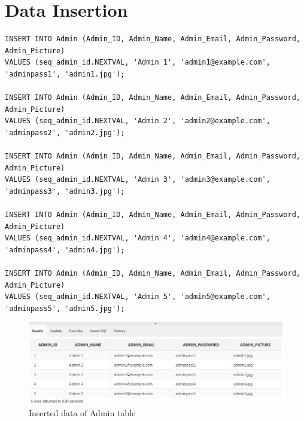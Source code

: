 \section{Data Insertion}
\hrulefill
\begin{lstlisting}[caption={Inserting data into Admin table},label={lst:insert_admin}]
INSERT INTO Admin (Admin_ID, Admin_Name, Admin_Email, Admin_Password, Admin_Picture)
VALUES (seq_admin_id.NEXTVAL, 'Admin 1', 'admin1@example.com', 'adminpass1', 'admin1.jpg');

INSERT INTO Admin (Admin_ID, Admin_Name, Admin_Email, Admin_Password, Admin_Picture)
VALUES (seq_admin_id.NEXTVAL, 'Admin 2', 'admin2@example.com', 'adminpass2', 'admin2.jpg');

INSERT INTO Admin (Admin_ID, Admin_Name, Admin_Email, Admin_Password, Admin_Picture)
VALUES (seq_admin_id.NEXTVAL, 'Admin 3', 'admin3@example.com', 'adminpass3', 'admin3.jpg');

INSERT INTO Admin (Admin_ID, Admin_Name, Admin_Email, Admin_Password, Admin_Picture)
VALUES (seq_admin_id.NEXTVAL, 'Admin 4', 'admin4@example.com', 'adminpass4', 'admin4.jpg');

INSERT INTO Admin (Admin_ID, Admin_Name, Admin_Email, Admin_Password, Admin_Picture)
VALUES (seq_admin_id.NEXTVAL, 'Admin 5', 'admin5@example.com', 'adminpass5', 'admin5.jpg');
\end{lstlisting}

\begin{figure}[H]
    \centering
    \includegraphics[width=1\textwidth]{images/TableData/ADMIN.png}
    \caption{Inserted data of Admin table}
\end{figure}


